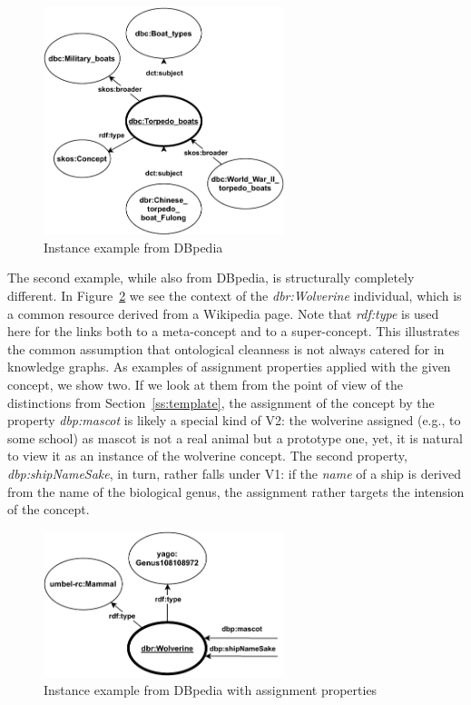 \begin{figure}[h]
\centering
\includegraphics[width=7cm]{figures/conc_diag_kg_ind1.pdf}
\caption{Instance example from DBpedia}
\label{fig:conc_diag_kg_ind1}
\end{figure}

The second example, while also from DBpedia, is structurally completely different. 
In Figure~\ref{fig:conc_diag_kg_ind2} we see the context of the \emph{dbr:Wolverine} individual, which is a common resource derived from a Wikipedia page.
Note that \emph{rdf:type} is used here for the links both to a meta-concept and to a super-concept. 
This illustrates the common assumption that ontological cleanness is not always catered for in knowledge graphs.
As examples of assignment properties applied with the given concept, we show two.
If we look at them from the point of view of the distinctions from Section~\ref{ss:template}, the assignment of the concept by the property \emph{dbp:mascot} is likely a special kind of V2: the wolverine assigned (e.g., to some school) as mascot is not a real animal but a prototype one, yet, it is natural to view it as an instance of the wolverine concept.
The second property, \emph{dbp:shipNameSake}, in turn, rather falls under V1: if the \emph{name} of a ship is derived from the name of the biological genus, the assignment rather targets the intension of the concept.

\begin{figure}[ht]
\centering
\includegraphics[width=7cm]{figures/conc_diag_kg_ind2.pdf}
\caption{Instance example from DBpedia with assignment properties}
\label{fig:conc_diag_kg_ind2}
\end{figure}
